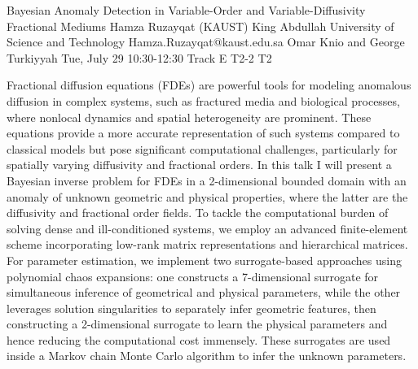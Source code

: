 \begin{talk}
  {Bayesian Anomaly Detection in Variable-Order and Variable-Diffusivity Fractional Mediums}%
  {Hamza Ruzayqat}%
  {(KAUST) King Abdullah University of Science and Technology}%
  {Hamza.Ruzayqat@kaust.edu.sa}%
  {Omar Knio and George Turkiyyah}%
  {}%
  {Tue, July 29 10:30-12:30 Track E}%
  {T2-2}%
  {T2}%
  
				
			
Fractional diffusion equations (FDEs) are powerful tools for modeling anomalous diffusion in complex systems, such as fractured media and biological processes, where nonlocal dynamics and spatial heterogeneity are prominent. These equations provide a more accurate representation of such systems compared to classical models but pose significant computational challenges, particularly for spatially varying diffusivity and fractional orders. In this talk I will present a Bayesian inverse problem for FDEs in a 2-dimensional bounded domain with an anomaly of unknown geometric and physical properties, where the latter are the diffusivity and fractional order fields. To tackle the computational burden of solving dense and ill-conditioned systems, we employ an advanced finite-element scheme incorporating low-rank matrix representations and hierarchical matrices. For parameter estimation, we implement two surrogate-based approaches using polynomial chaos expansions: one constructs a 7-dimensional surrogate for simultaneous inference of geometrical and physical parameters, while the other leverages solution singularities to separately infer geometric features, then constructing a 2-dimensional surrogate to learn the physical parameters and hence reducing the computational cost immensely. These surrogates are used inside a Markov chain Monte Carlo algorithm to infer the unknown parameters.

\medskip

\end{talk}

